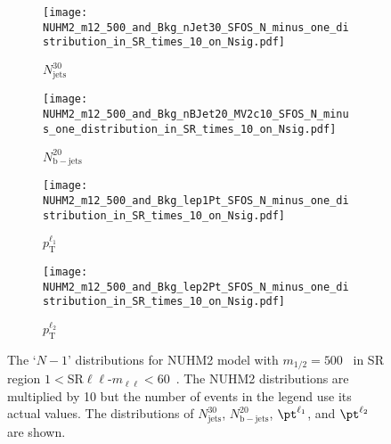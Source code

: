 \begin{figure}[htbp]
    \begin{center}
        \begin{subfigure}[b]{0.48\textwidth}
            \texttt{[image: NUHM2\_m12\_500\_and\_Bkg\_nJet30\_SFOS\_N\_minus\_one\_distribution\_in\_SR\_times\_10\_on\_Nsig.pdf]}
            \caption{$N^{30}_{\mathrm{jets}}$}
            \label{fig:event_nuhm2_m12_500_nJet30_SFOS}
        \end{subfigure}
        \begin{subfigure}[b]{0.48\textwidth}
            \texttt{[image: NUHM2\_m12\_500\_and\_Bkg\_nBJet20\_MV2c10\_SFOS\_N\_minus\_one\_distribution\_in\_SR\_times\_10\_on\_Nsig.pdf]}
            \caption{$N^{20}_{\mathrm{b-jets}}$}
            \label{fig:event_nuhm2_m12_500_nBJet20_SFOS}
        \end{subfigure}
        \begin{subfigure}[b]{0.48\textwidth}
            \texttt{[image: NUHM2\_m12\_500\_and\_Bkg\_lep1Pt\_SFOS\_N\_minus\_one\_distribution\_in\_SR\_times\_10\_on\_Nsig.pdf]}
            \caption{$p^{\ell_1}_{\mathrm{T}}$}
            \label{fig:event_nuhm2_m12_500_lep1Pt_SFOS}
        \end{subfigure}
        \begin{subfigure}[b]{0.48\textwidth}
            \texttt{[image: NUHM2\_m12\_500\_and\_Bkg\_lep2Pt\_SFOS\_N\_minus\_one\_distribution\_in\_SR\_times\_10\_on\_Nsig.pdf]}
            \caption{$p^{\ell_2}_{\mathrm{T}}$}
            \label{fig:event_nuhm2_m12_500_lep2Pt_SFOS}
        \end{subfigure}
    \end{center}
    \caption{The `$N-1$' distributions for NUHM2 model with $m_{1/2} = 500$~{\GeV} in SR region $1 < $SR$\ell \ell$-$m_{\ell \ell} < 60$~{\GeV}.
    The NUHM2 distributions are multiplied by 10 but the number of events in the legend use its actual values.
    The distributions of $N_\mathrm{jets}^{30}$, $N_\mathrm{b-jets}^{20}$, $\pt^{\ell_{1}}$, and $\pt^{\ell_{2}}$ are shown.}
    \label{fig:event_nuhm2_kinematic_in_SR_SFOS_1}
\end{figure}

